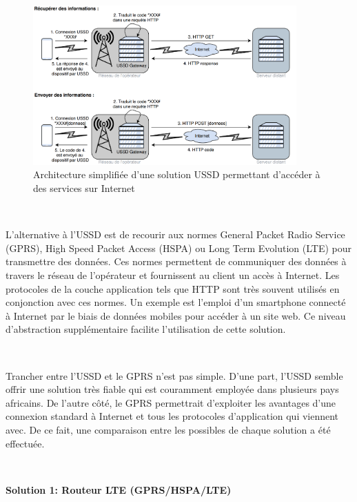 \begin{figure}[ht!]
  \centering
  \includegraphics[width=0.90\textwidth]{img/el_prototype/ussd_examples.png}
  \caption{Architecture simplifiée d'une solution USSD permettant d'accéder à des services sur Internet}
  \label{fig:ussdex}
\end{figure}

~

\noindent
L'alternative à l'USSD est de recourir aux normes General Packet Radio Service (GPRS), High Speed Packet Access (HSPA) ou Long Term Evolution (LTE) pour transmettre des données. Ces normes permettent de communiquer des données à travers le réseau de l'opérateur et fournissent au client un accès à Internet. Les protocoles de la couche application tels que HTTP sont très souvent utilisés en conjonction avec ces normes. Un exemple est l'emploi d'un smartphone connecté à Internet par le biais de données mobiles pour accéder à un site web. Ce niveau d'abstraction supplémentaire facilite l'utilisation de cette solution.

~

\noindent
Trancher entre l'USSD et le GPRS n'est pas simple. D'une part, l'USSD semble offrir une solution très fiable qui est couramment employée dans plusieurs pays africains. De l'autre côté, le GPRS permettrait d'exploiter les avantages d'une connexion standard à Internet et tous les protocoles d'application qui viennent avec. De ce fait, une comparaison entre les possibles de chaque solution a été effectuée.


~


\textbf{Solution 1: Routeur LTE (GPRS/HSPA/LTE)}

\vspace{-0.2cm}
~


